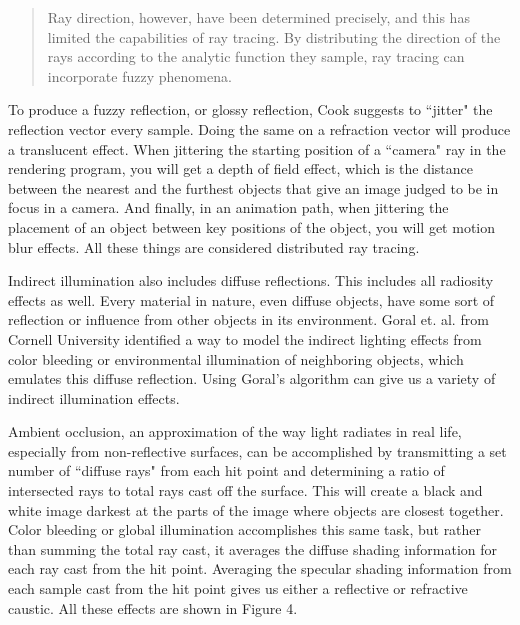 \documentclass{article}
\begin{document}
\begin{quote}
Ray direction, however, have been determined precisely, and this has limited the capabilities of ray tracing.  By distributing the direction of the rays according to the analytic function they sample, ray tracing can incorporate fuzzy phenomena.
\end{quote}

To produce a fuzzy reflection, or glossy reflection, Cook suggests to ``jitter" the reflection vector every sample.  Doing the same on a refraction vector will produce a translucent effect.  When jittering the starting position of a ``camera" ray in the rendering program, you will get a depth of field effect, which is the distance between the nearest and the furthest objects that give an image judged to be in focus in a camera.  And finally, in an animation path, when jittering the placement of an object between key positions of the object, you will get motion blur effects. All these things are considered distributed ray tracing.

 Indirect illumination also includes diffuse reflections.  This includes all radiosity effects as well.  Every material in nature, even diffuse objects, have some sort of reflection or influence from other objects in its environment.  Goral et. al. from Cornell University identified a way to model the indirect lighting effects from color bleeding or environmental illumination of neighboring objects, which emulates this diffuse reflection\cite{Goral:1984}.  Using Goral's algorithm can give us a variety of indirect illumination effects.

Ambient occlusion, an approximation of the way light radiates in real life, especially from non-reflective surfaces, can be accomplished by transmitting a set number of ``diffuse rays" from each hit point and determining a ratio of intersected rays to total rays cast off the surface.  This will create a black and white image darkest at the parts of the image where objects are closest together.  Color bleeding or global illumination accomplishes this same task, but rather than summing the total ray cast, it averages the diffuse shading information for each ray cast from the hit point.  Averaging the specular shading information from each sample cast from the hit point gives us either a reflective or refractive caustic.  All these effects are shown in Figure 4.
\end{document}

